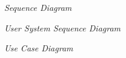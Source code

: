 \begin{figure}[!ht]
\centering
{}
\caption{\em Sequence Diagram}
\end{figure}

\begin{figure}[!ht]
\centering
{}
\caption{\em User System Sequence Diagram}
\end{figure}

\begin{figure}[!ht]
\centering
{}
\caption{\em Use Case Diagram}
\end{figure}

